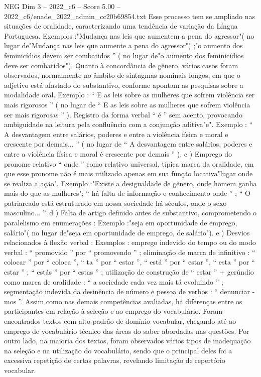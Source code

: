 \begin{textsample}{NEG Dim 3 – 2022\_c6 – Score 5.00 – 2022\_c6/enade\_2022\_admin\_cc20b69854.txt}
Esse processo tem se ampliado nas situações de oralidade, caracterizando uma tendência de variação da Língua Portuguesa.
Exemplos :"Mudança nas leis que aumentem a pena do agressor"( no lugar de"Mudança nas leis que aumente a pena do agressor") ;"o aumento dos feminicídios devem ser combatidos ” ( no lugar de"o aumento dos feminicídios deve ser combatidos").
Quanto à concordância de gênero, vários casos foram observados, normalmente no âmbito de sintagmas nominais longos, em que o adjetivo está afastado do substantivo, conforme apontam as pesquisas sobre a modalidade oral.
Exemplo : “ E as leis sobre as mulheres que sofrem violência ser mais rigorosos ” ( no lugar de “ E as leis sobre as mulheres que sofrem violência ser mais rigorosas ” ).
Registro da forma verbal “ é ” sem acento, provocando ambiguidade na leitura pela confluência com a conjunção aditiva"e".
Exemplo : “ A desvantagem entre salários, poderes e entre a violência física e moral e crescente por demais... ” ( no lugar de “ A desvantagem entre salários, poderes e entre a violência física e moral é crescente por demais ” ). c ) Emprego do pronome relativo “ onde ” como relativo universal, típica marca da oralidade, em que esse pronome não é mais utilizado apenas em sua função locativa"lugar onde se realiza a ação".
Exemplo :"Existe a desigualdade de gênero, onde homem ganha mais do que as mulheres"; “ há falta de informação e conhecimento onde ” ; “ O patriarcado está estruturado em nossa sociedade há séculos, onde o sexo masculino... ”. d ) Falta de artigo definido antes de substantivo, comprometendo o paralelismo em enumerações : Exemplo :"seja em oportunidade de emprego, salário"( no lugar de"seja em oportunidade de emprego, de salário"). e ) Desvios relacionados à flexão verbal : Exemplos : emprego indevido do tempo ou do modo verbal : “ promovido ” por “ promovendo ” ; eliminação de marca de infinitivo : “ colocar ” por “ coloca ”, “ ta ” por “ estar ”, “ está ” por “ estar ”, “ esta ” por “ estar ” ; “ estás ” por “ estas ” ; utilização de construção de “ estar ” + gerúndio como marca de oralidade : “ a sociedade cada vez mais tá evoluindo ” ; segmentação indevida da desinência de número e pessoa de verbos : “ denunciar -mos ”.
Assim como nas demais competências avaliadas, há diferenças entre os participantes em relação à seleção e ao emprego do vocabulário.
Foram encontrados textos com alto padrão de domínio vocabular, chegando até ao emprego de vocabulário técnico das áreas do saber abordadas nas questões.
Por outro lado, na maioria dos textos, foram observados vários tipos de inadequação na seleção e na utilização do vocabulário, sendo que o principal deles foi a excessiva repetição de certas palavras, revelando limitação de repertório vocabular.

\end{textsample}
